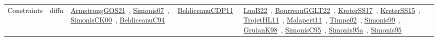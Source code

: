 {\begin{longtable}{lp{3cm}>{\raggedright\arraybackslash}p{6cm}>{\raggedright\arraybackslash}p{6cm}>{\raggedright\arraybackslash}p{8cm}}
Constraints & diffn & \href{works/ArmstrongGOS21.pdf}{ArmstrongGOS21}~\cite{ArmstrongGOS21}, \href{works/Simonis07.pdf}{Simonis07}~\cite{Simonis07}, \href{works/SimonisCK00.pdf}{SimonisCK00}~\cite{SimonisCK00}, \href{works/BeldiceanuC94.pdf}{BeldiceanuC94}~\cite{BeldiceanuC94} & \href{works/BeldiceanuCDP11.pdf}{BeldiceanuCDP11}~\cite{BeldiceanuCDP11} & \href{works/LuoB22.pdf}{LuoB22}~\cite{LuoB22}, \href{works/BourreauGGLT22.pdf}{BourreauGGLT22}~\cite{BourreauGGLT22}, \href{works/KreterSS17.pdf}{KreterSS17}~\cite{KreterSS17}, \href{works/KreterSS15.pdf}{KreterSS15}~\cite{KreterSS15}, \href{works/TrojetHL11.pdf}{TrojetHL11}~\cite{TrojetHL11}, \href{works/Malapert11.pdf}{Malapert11}~\cite{Malapert11}, \href{works/Timpe02.pdf}{Timpe02}~\cite{Timpe02}, \href{works/Simonis99.pdf}{Simonis99}~\cite{Simonis99}, \href{works/GruianK98.pdf}{GruianK98}~\cite{GruianK98}, \href{works/SimonisC95.pdf}{SimonisC95}~\cite{SimonisC95}, \href{works/Simonis95a.pdf}{Simonis95a}~\cite{Simonis95a}, \href{works/Simonis95.pdf}{Simonis95}~\cite{Simonis95}\\

\end{longtable}}
